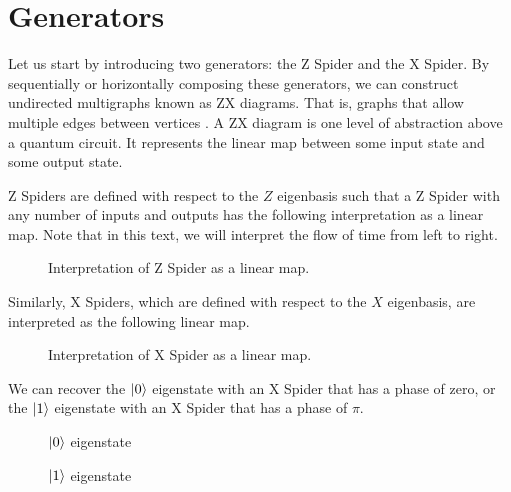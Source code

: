 \section{Generators}

Let us start by introducing two generators: the Z Spider and the X Spider. By sequentially or horizontally composing these generators, we can construct undirected multigraphs known as ZX diagrams. That is, graphs that allow multiple edges between vertices \cite{Wetering2020}. A ZX diagram is one level of abstraction above a quantum circuit. It represents the linear map between some input state and some output state.

Z Spiders are defined with respect to the $Z$ eigenbasis such that a Z Spider with any number of inputs and outputs has the following interpretation as a linear map. Note that in this text, we will interpret the flow of time from left to right.
\begin{figure}[H]
\centering
{}
\caption{Interpretation of Z Spider as a linear map.}
\end{figure}
Similarly, X Spiders, which are defined with respect to the $X$ eigenbasis, are interpreted as the following linear map.
\begin{figure}[H]
\centering
{}
\caption{Interpretation of X Spider as a linear map.}
\end{figure}

We can recover the $\ket 0$ eigenstate with an X Spider that has a phase of zero, or the $\ket 1$ eigenstate with an X Spider that has a phase of $\pi$.
\begin{figure}[H]
\centering
\begin{minipage}{.4\textwidth}
    \centering
    \caption{$\ket 0$ eigenstate}
\end{minipage}%
\begin{minipage}{.4\textwidth}
    \centering
    \caption{$\ket 1$ eigenstate}
\end{minipage}
\end{figure}

